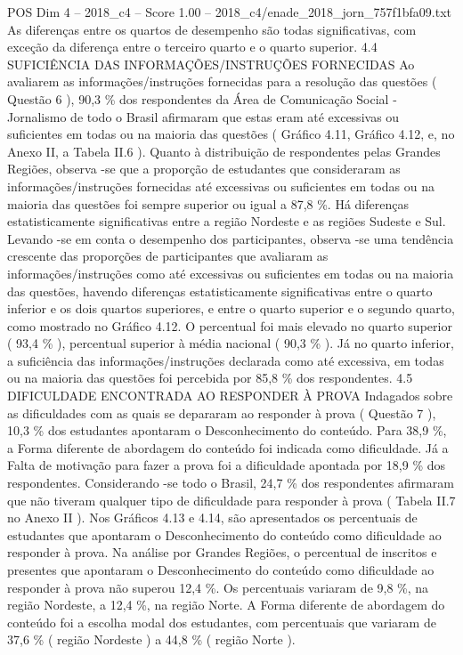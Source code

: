 \begin{textsample}{POS Dim 4 – 2018\_c4 – Score 1.00 – 2018\_c4/enade\_2018\_jorn\_757f1bfa09.txt}
As diferenças entre os quartos de desempenho são todas significativas, com exceção da diferença entre o terceiro quarto e o quarto superior. 4.4 SUFICIÊNCIA DAS INFORMAÇÕES/INSTRUÇÕES FORNECIDAS Ao avaliarem as informações/instruções fornecidas para a resolução das questões ( Questão 6 ), 90,3 \% dos respondentes da Área de Comunicação Social - Jornalismo de todo o Brasil afirmaram que estas eram até excessivas ou suficientes em todas ou na maioria das questões ( Gráfico 4.11, Gráfico 4.12, e, no Anexo II, a Tabela II.6 ).
Quanto à distribuição de respondentes pelas Grandes Regiões, observa -se que a proporção de estudantes que consideraram as informações/instruções fornecidas até excessivas ou suficientes em todas ou na maioria das questões foi sempre superior ou igual a 87,8 \%.
Há diferenças estatisticamente significativas entre a região Nordeste e as regiões Sudeste e Sul.
Levando -se em conta o desempenho dos participantes, observa -se uma tendência crescente das proporções de participantes que avaliaram as informações/instruções como até excessivas ou suficientes em todas ou na maioria das questões, havendo diferenças estatisticamente significativas entre o quarto inferior e os dois quartos superiores, e entre o quarto superior e o segundo quarto, como mostrado no Gráfico 4.12.
O percentual foi mais elevado no quarto superior ( 93,4 \% ), percentual superior à média nacional ( 90,3 \% ).
Já no quarto inferior, a suficiência das informações/instruções declarada como até excessiva, em todas ou na maioria das questões foi percebida por 85,8 \% dos respondentes. 4.5 DIFICULDADE ENCONTRADA AO RESPONDER À PROVA Indagados sobre as dificuldades com as quais se depararam ao responder à prova ( Questão 7 ), 10,3 \% dos estudantes apontaram o Desconhecimento do conteúdo.
Para 38,9 \%, a Forma diferente de abordagem do conteúdo foi indicada como dificuldade.
Já a Falta de motivação para fazer a prova foi a dificuldade apontada por 18,9 \% dos respondentes.
Considerando -se todo o Brasil, 24,7 \% dos respondentes afirmaram que não tiveram qualquer tipo de dificuldade para responder à prova ( Tabela II.7 no Anexo II ).
Nos Gráficos 4.13 e 4.14, são apresentados os percentuais de estudantes que apontaram o Desconhecimento do conteúdo como dificuldade ao responder à prova.
Na análise por Grandes Regiões, o percentual de inscritos e presentes que apontaram o Desconhecimento do conteúdo como dificuldade ao responder à prova não superou 12,4 \%.
Os percentuais variaram de 9,8 \%, na região Nordeste, a 12,4 \%, na região Norte.
A Forma diferente de abordagem do conteúdo foi a escolha modal dos estudantes, com percentuais que variaram de 37,6 \% ( região Nordeste ) a 44,8 \% ( região Norte ).

\end{textsample}
